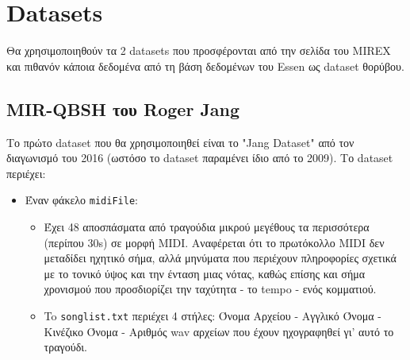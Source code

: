 \section{Datasets}

Θα χρησιμοποιηθούν τα 2 datasets που προσφέρονται από την σελίδα του MIREX \cite{mirex}
και πιθανόν κάποια δεδομένα από τη βάση δεδομένων του Essen ως dataset θορύβου.

\subsection{MIR-QBSH του Roger Jang}
Το πρώτο dataset που θα χρησιμοποιηθεί είναι το "Jang Dataset" \cite{jang-dataset} από τον διαγωνισμό του 2016 (ωστόσο το dataset παραμένει ίδιο από το 2009). Το dataset περιέχει:
\begin{itemize}
	\item Έναν φάκελο \texttt{midiFile}:
	      \begin{itemize}
	      	\item Έχει 48 αποσπάσματα από τραγούδια μικρού μεγέθους τα περισσότερα (περίπου 30s) σε μορφή MIDI\cite{midi1996complete}.
	      	      Αναφέρεται ότι το πρωτόκολλο MIDI δεν μεταδίδει ηχητικό σήμα, αλλά μηνύματα που περιέχουν πληροφορίες σχετικά με το τονικό ύψος και την ένταση μιας νότας, καθώς επίσης και σήμα χρονισμού που προσδιορίζει την ταχύτητα - το tempo - ενός κομματιού.
	      	\item To \texttt{songlist.txt} περιέχει 4 στήλες: Όνομα Αρχείου - Αγγλικό Όνομα - Κινέζικο Όνομα - Αριθμός wav αρχείων που έχουν ηχογραφηθεί γι' αυτό το τραγούδι.
	      \end{itemize}


\end{itemize}
